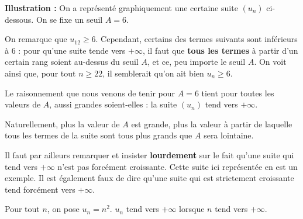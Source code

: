 \documentclass[11pt,fleqn]{book} %
\begin{document}
\textbf{Illustration :} On a représenté graphiquement une certaine suite $(u_n)$ ci-dessous. On se fixe un seuil $A=6$.
\begin{center}

\end{center}

On remarque que $u_{12} \geqslant 6$. Cependant, certains des termes suivants sont inférieurs à 6 : pour qu'une suite tende vers $+\infty$, il faut que \textbf{tous les termes} à partir d'un certain rang soient au-dessus du seuil $A$, et ce, peu importe le seuil $A$.
On voit ainsi que, pour tout $n\geqslant 22$, il semblerait qu'on ait bien $u_n \geqslant 6$.

Le raisonnement que nous venons de tenir pour $A=6$ tient pour toutes les valeurs de $A$, aussi grandes soient-elles : la suite $(u_n)$ tend vers $+\infty$.

Naturellement, plus la valeur de $A$ est grande, plus la valeur à partir de laquelle tous les termes de la suite sont tous plus grands que $A$ sera lointaine.

Il faut par ailleurs remarquer et insister \textbf{lourdement} sur le fait qu'une suite qui tend vers $+\infty$ n'est pas forcément croissante. Cette suite ici représentée en est un exemple. Il est également faux de dire qu'une suite qui est strictement croissante tend forcément vers $+\infty$.

\newpage

\begin{example} Pour tout $n$, on pose $u_n=n^2$. $u_n$ tend vers $+\infty$ lorsque $n$ tend vers $+\infty$. 

\vskip80pt
\end{example}
\end{document}
